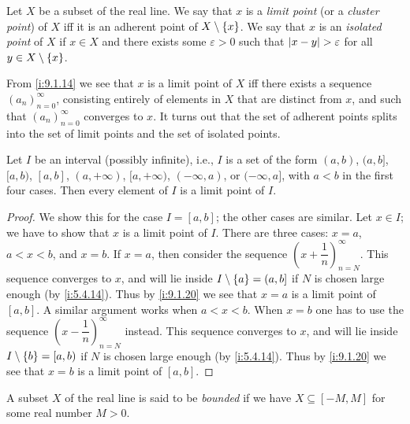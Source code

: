 \begin{defn}\label{i:9.1.18}
  Let \(X\) be a subset of the real line.
  We say that \(x\) is a \emph{limit point} (or a \emph{cluster point}) of \(X\) iff it is an adherent point of \(X \setminus \left\lbrace x\right\rbrace\).
  We say that \(x\) is an \emph{isolated point} of \(X\) if \(x \in X\) and there exists some \(\varepsilon > 0\) such that \(\left\lvert x - y\right\rvert > \varepsilon\) for all \(y \in X \setminus \left\lbrace x\right\rbrace\).
\end{defn}

\setcounter{thm}{19}
\begin{rmk}\label{i:9.1.20}
  From \cref{i:9.1.14} we see that \(x\) is a limit point of \(X\) iff there exists a sequence \((a_n)_{n = 0}^\infty\), consisting entirely of elements in \(X\) that are distinct from \(x\), and such that \((a_n)_{n = 0}^\infty\) converges to \(x\).
  It turns out that the set of adherent points splits into the set of limit points and the set of isolated points.
\end{rmk}

\begin{lem}\label{i:9.1.21}
  Let \(I\) be an interval (possibly infinite), i.e., \(I\) is a set of the form \((a, b)\), \((a, b]\), \([a, b)\), \([a, b]\), \((a, +\infty)\), \([a, +\infty)\), \((-\infty, a)\), or \((-\infty, a]\), with \(a < b\) in the first four cases.
  Then every element of \(I\) is a limit point of \(I\).
\end{lem}

\begin{proof}
  We show this for the case \(I = [a, b]\);
  the other cases are similar.
  Let \(x \in I\);
  we have to show that \(x\) is a limit point of \(I\).
  There are three cases: \(x = a\), \(a < x < b\), and \(x = b\).
  If \(x = a\), then consider the sequence \((x + \dfrac{1}{n})_{n = N}^\infty\).
  This sequence converges to \(x\), and will lie inside \(I \setminus \left\lbrace a\right\rbrace = (a, b]\) if \(N\) is chosen large enough (by \cref{i:5.4.14}).
  Thus by \cref{i:9.1.20} we see that \(x = a\) is a limit point of \([a, b]\).
  A similar argument works when \(a < x < b\).
  When \(x = b\) one has to use the sequence \((x - \dfrac{1}{n})_{n = N}^\infty\) instead.
  This sequence converges to \(x\), and will lie inside \(I \setminus \left\lbrace b\right\rbrace = [a, b)\) if \(N\) is chosen large enough (by \cref{i:5.4.14}).
  Thus by \cref{i:9.1.20} we see that \(x = b\) is a limit point of \([a, b]\).
\end{proof}

\begin{defn}\label{i:9.1.22}
  A subset \(X\) of the real line is said to be \emph{bounded} if we have \(X \subseteq [-M, M]\) for some real number \(M > 0\).
\end{defn}

